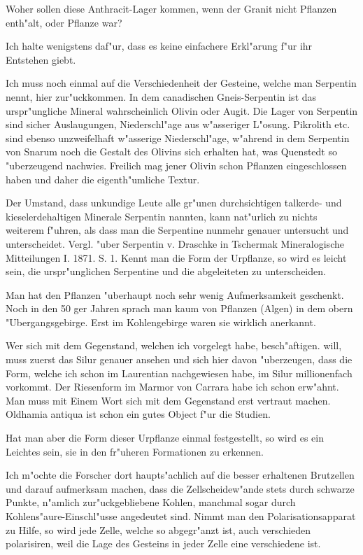 \documentclass[a4paper, 11pt, oneside, german]{article}
\begin{document}
Woher sollen diese Anthracit-Lager kommen, wenn der Granit nicht Pflanzen enth"alt, oder Pflanze war?

Ich halte wenigstens daf"ur, dass es keine einfachere Erkl"arung f"ur ihr Entstehen giebt.

Ich muss noch einmal auf die Verschiedenheit der Gesteine, welche man Serpentin nennt, hier zur"uckkommen. In dem canadischen Gneis-Serpentin ist das urspr"ungliche Mineral wahrscheinlich Olivin oder Augit. Die Lager von Serpentin sind sicher Auslaugungen, Niederschl"age aus w"asseriger L"osung. Pikrolith etc. sind ebenso unzweifelhaft w"asserige Niederschl"age, w"ahrend in dem Serpentin von Snarum noch die Gestalt des Olivins sich erhalten hat, was Quenstedt so "uberzeugend nachwies. Freilich mag jener Olivin schon Pflanzen eingeschlossen haben und daher die eigenth"umliche Textur.

Der Umstand, dass unkundige Leute alle gr"unen durchsichtigen talkerde- und kieselerdehaltigen Minerale Serpentin nannten, kann nat"urlich zu nichts weiterem f"uhren, als dass man die Serpentine nunmehr genauer untersucht und unterscheidet. Vergl. "uber Serpentin v. Draschke in Tschermak Mineralogische Mitteilungen I. 1871. S. 1. Kennt man die Form der Urpflanze, so wird es leicht sein, die urspr"unglichen Serpentine und die abgeleiteten zu unterscheiden.

Man hat den Pflanzen "uberhaupt noch sehr wenig Aufmerksamkeit geschenkt. Noch in den 50 ger Jahren sprach man kaum von Pflanzen (Algen) in dem obern "Ubergangsgebirge. Erst im Kohlengebirge waren sie wirklich anerkannt.

Wer sich mit dem Gegenstand, welchen ich vorgelegt habe, besch"aftigen. will, muss zuerst das Silur genauer ansehen und sich hier davon "uberzeugen, dass die Form, welche ich schon im Laurentian nachgewiesen habe, im Silur millionenfach vorkommt. Der Riesenform im Marmor von Carrara habe ich schon erw"ahnt. Man muss mit Einem Wort sich mit dem Gegenstand erst vertraut machen. Oldhamia antiqua ist schon ein gutes Object f"ur die Studien.

Hat man aber die Form dieser Urpflanze einmal festgestellt, so wird es ein Leichtes sein, sie in den fr"uheren Formationen zu erkennen.

Ich m"ochte die Forscher dort haupts"achlich auf die besser erhaltenen Brutzellen und darauf aufmerksam machen, dass die Zellscheidew"ande stets durch schwarze Punkte, n"amlich zur"uckgebliebene Kohlen, manchmal sogar durch Kohlens"aure-Einschl"usse angedeutet sind. Nimmt man den Polarisationsapparat zu Hilfe, so wird jede Zelle, welche so abgegr"anzt ist, auch verschieden polarisiren, weil die Lage des Gesteins in jeder Zelle eine verschiedene ist.
\end{document}
